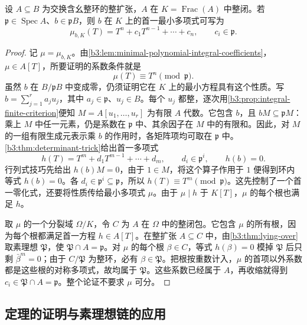 \begin{lemma}\label{b3:lem:minimal-polynomial-prime-coefficients}
	设 \(A\subseteq B\) 为交换含幺整环的整扩张，\(A\) 在 \(K=\operatorname{Frac}(A)\) 中整闭。若 \(\mathfrak p\in\operatorname{Spec}A\)、\(b\in\mathfrak pB\)，则 \(b\) 在 \(K\) 上的首一最小多项式可写为
	\[
		\mu_{b,K}(T)=T^n+c_1T^{n-1}+\cdots+c_n, \qquad c_i\in\mathfrak p.
	\]
\end{lemma}
\begin{proof}
	记 \(\mu=\mu_{b,K}\)。由\cref{b3:lem:minimal-polynomial-integral-coefficients}，\(\mu\in A[T]\)，所要证明的系数条件就是
	\[
		\mu(T)\equiv T^n\pmod{\mathfrak p}.
	\]
	虽然 \(b\) 在 \(B/\mathfrak pB\) 中变成零，仍须证明它在 \(K\) 上的最小方程具有这个性质。写 \(b=\sum_{j=1}^r a_ju_j\)，其中 \(a_j\in\mathfrak p\)、\(u_j\in B\)。每个 \(u_j\) 都整，逐次用\cref{b3:prop:integral-finite-criterion}便知 \(M=A[u_1,\ldots,u_r]\) 为有限 \(A\) 代数。它包含 \(b\)，且 \(bM\subseteq\mathfrak pM\)：乘上 \(M\) 中任一元素，仍是系数在 \(\mathfrak p\) 中、其余因子在 \(M\) 中的有限和。因此，对 \(M\) 的一组有限生成元表示乘 \(b\) 的作用时，各矩阵项均可取在 \(\mathfrak p\) 中。\cref{b3:thm:determinant-trick}给出首一多项式
	\[
		h(T)=T^m+d_1T^{m-1}+\cdots+d_m, \qquad d_i\in\mathfrak p^i, \qquad h(b)=0.
	\]
	行列式技巧先给出 \(h(b)M=0\)，由于 \(1\in M\)，将这个算子作用于 \(1\) 便得到环内等式 \(h(b)=0\)。各 \(d_i\in\mathfrak p^i\subseteq\mathfrak p\)，所以 \(h(T)\equiv T^m\pmod{\mathfrak p}\)。这先控制了一个首一零化式，还要将性质传给最小多项式 \(\mu\)。由于 \(\mu\mid h\) 于 \(K[T]\)，\(\mu\) 的每个根也满足 \(h\)。

	取 \(\mu\) 的一个分裂域 \(\Omega/K\)，令 \(C\) 为 \(A\) 在 \(\Omega\) 中的整闭包。它包含 \(\mu\) 的所有根，因为每个根都满足首一方程 \(h\in A[T]\)。在整扩张 \(A\subseteq C\) 中，由\cref{b3:thm:lying-over}取素理想 \(\mathfrak P\)，使 \(\mathfrak P\cap A=\mathfrak p\)。对 \(\mu\) 的每个根 \(\beta\in C\)，等式 \(h(\beta)=0\) 模掉 \(\mathfrak P\) 后只剩 \(\bar\beta^m=0\)；由于 \(C/\mathfrak P\) 为整环，必有 \(\beta\in\mathfrak P\)。把根按重数计入，\(\mu\) 的首项以外系数都是这些根的对称多项式，故均属于 \(\mathfrak P\)。这些系数已经属于 \(A\)，再收缩就得到 \(c_i\in\mathfrak P\cap A=\mathfrak p\)。整个论证不要求 \(\mu\) 可分。
\end{proof}

\subsection{定理的证明与素理想链的应用}\label{b3:subsec:0503:02}

